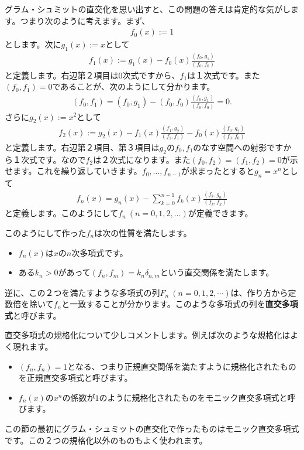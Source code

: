\documentclass[report,paper=a4, fontsize=12pt, line_length=16cm, number_of_lines=33,dvipdfmx]{jlreq}
\numberwithin{equation}{section}
\newcommand{\strong}[1]{\textsf{\bfseries #1}}
\begin{document}
グラム・シュミットの直交化を思い出すと、この問題の答えは肯定的な気がします。つまり次のように考えます。まず、
\begin{align}
  f_0(x):=1
\end{align}
とします。次に$g_1(x):=x$として
\begin{align}
  f_1(x):=g_1(x)-f_0(x)\frac{(f_0,g_1)}{(f_0,f_0)}
\end{align}
と定義します。右辺第２項目は$0$次式ですから、$f_1$は１次式です。また$(f_0,f_1)=0$であることが、次のようにして分かります。
\begin{align}
  (f_0,f_1)=(f_0,g_1)-(f_0,f_0)\frac{(f_0,g_1)}{(f_0,f_0)}=0.
\end{align}
さらに$g_2(x):=x^2$として
\begin{align}
  f_2(x):=g_2(x)-f_1(x)\frac{(f_1,g_2)}{(f_1,f_1)}-f_0(x)\frac{(f_0,g_2)}{(f_0,f_0)}
\end{align}
と定義します。右辺第２項目、第３項目は$g_2$の$f_0,f_1$のなす空間への射影ですから１次式です。なので$f_2$は２次式になります。また$(f_0,f_2)=(f_1,f_2)=0$が示せます。これを繰り返していきます。$f_0,\dots,f_{n-1}$が求まったとすると$g_{n}=x^{n}$として
\begin{align}
  f_{n}(x)=g_{n}(x)-\sum_{k=0}^{n-1}f_k(x)\frac{(f_k,g_n)}{(f_k,f_k)}
  \label{monicGram–Schmidt}
\end{align}
と定義します。このようにして$f_n\ (n=0,1,2,\dots)$が定義できます。

このようにして作った$f_n$は次の性質を満たします。
\begin{itemize}
  \item $f_n(x)$は$x$の$n$次多項式です。
  \item ある$k_n>0$があって$(f_n,f_m)=k_n\delta_{n,m}$という直交関係を満たします。
\end{itemize}
逆に、この２つを満たすような多項式の列$F_n\ (n=0,1,2,\cdots)$は、作り方から定数倍を除いて$f_n$と一致することが分かります。このような多項式の列を\strong{直交多項式}と呼びます。

直交多項式の規格化について少しコメントします。例えば次のような規格化はよく現れます。
\begin{itemize}
  \item $(f_n,f_n)=1$となる、つまり正規直交関係を満たすように規格化されたものを正規直交多項式と呼びます。
  \item $f_n(x)$の$x^n$の係数が$1$のように規格化されたものをモニック直交多項式と呼びます。
\end{itemize}
この節の最初にグラム・シュミットの直交化で作ったものはモニック直交多項式です。この２つの規格化以外のものもよく使われます。
\end{document}

